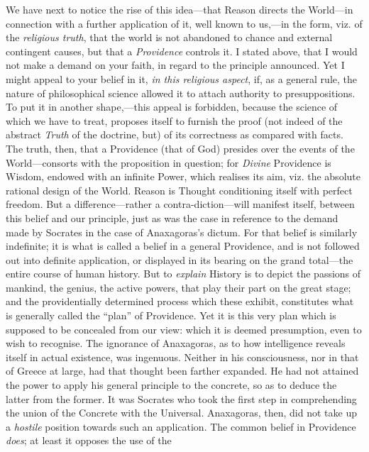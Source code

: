 We have next to notice the rise of this idea---that Reason directs the
World---in connection with a further application of it, well known to
us,---in the form, viz. of the \textit{religious truth}, that the
world is not abandoned to chance and external contingent causes, but
that a \textit{Providence} controls it. I stated above, that I would
not make a demand on your faith, in regard to the principle announced.
Yet I might appeal to your belief in it, \textit{in this religious
aspect}, if, as a general rule, the nature of philosophical science
allowed it to attach authority to presuppositions. To put it in
another shape,---this appeal is forbidden, because the science of
which we have to treat, proposes itself to furnish the proof (not
indeed of the abstract \textit{Truth} of the doctrine, but) of its
correctness as compared with facts. The truth, then, that a Providence
(that of God) presides over the events of the World---consorts with
the proposition in question; for \textit{Divine} Providence is Wisdom,
endowed with an infinite Power, which realises its aim, viz. the
absolute rational design of the World. Reason is Thought conditioning
itself with perfect freedom. But a difference---rather a
contra-diction---will manifest itself, between this belief
and our principle, just as was the case in reference to the demand
made by Socrates in the case of Anaxagoras's dictum. For that belief
is similarly indefinite; it is what is called a belief in a general
Providence, and is not followed out into definite application, or
displayed in its bearing on the grand total---the entire course of
human history. But to \textit{explain} History is to depict the
passions of mankind, the genius, the active powers, that play their
part on the great stage; and the providentially determined process
which these exhibit, constitutes what is generally called the ``plan''
of Providence. Yet it is this very plan which is supposed to be
concealed from our view: which it is deemed presumption, even to wish
to recognise. The ignorance of Anaxagoras, as to how intelligence
reveals itself in actual existence, was ingenuous. Neither in his
consciousness, nor in that of Greece at large, had that thought been
farther expanded. He had not attained the power to apply his general
principle to the concrete, so as to deduce the latter from the former.
It was Socrates who took the first step in comprehending the union of
the Concrete with the Universal. Anaxagoras, then, did not take up a
\textit{hostile} position towards such an application. The common
belief in Providence \textit{does}; at least it opposes the use of the
